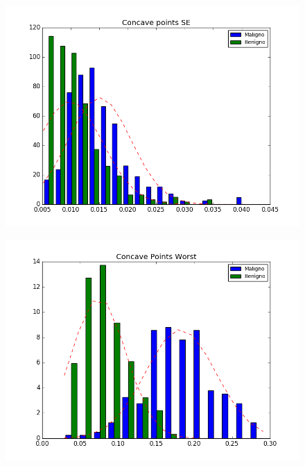 \documentclass[11pt,a4paper]{article}
\numberwithin{equation}{section}
\begin{document}
\begin{itemize}
\begin{figure}[H]
\centering
\begin{minipage}{.5\textwidth}
  \centering
  \includegraphics[width=\linewidth]{../img/hist/concave_points_se}
  \label{fig:test1}
\end{minipage}%
\begin{minipage}{.5\textwidth}
  \centering
  \includegraphics[width=\linewidth]{../img/hist/concave_points_worst}
  \label{fig:test2}
\end{minipage}
\end{figure}


\end{itemize}
\end{document}

